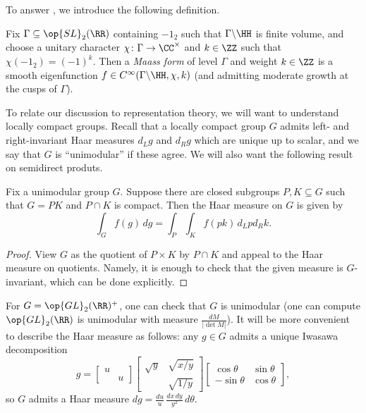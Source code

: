 \documentclass{article}
\begin{document}
To answer , we introduce the following definition.
\begin{definition}
	Fix $\Gamma\subseteq\op{SL}_2(\RR)$ containing $-1_2$ such that $\Gamma\backslash\HH$ is finite volume, and choose a unitary character $\chi\colon\Gamma\to\CC^\times$ and $k\in\ZZ$ such that $\chi(-1_2)=(-1)^k$. Then a \textit{Maass form} of level $\Gamma$ and weight $k\in\ZZ$ is a smooth eigenfunction $f\in C^\infty(\Gamma\backslash\HH,\chi,k)$ (and admitting moderate growth at the cusps of $\Gamma$).
\end{definition}
To relate our discussion to representation theory, we will want to understand locally compact groups. Recall that a locally compact group $G$ admits left- and right-invariant Haar measures $d_Lg$ and $d_Rg$ which are unique up to scalar, and we say that $G$ is ``unimodular'' if these agree. We will also want the following result on semidirect produts.
\begin{proposition}
	Fix a unimodular group $G$. Suppose there are closed subgroups $P,K\subseteq G$ such that $G=PK$ and $P\cap K$ is compact. Then the Haar measure on $G$ is given by
	\[\int_Gf(g)\,dg=\int_P\int_Kf(pk)\,d_Lpd_Rk.\]
\end{proposition}
\begin{proof}
	View $G$ as the quotient of $P\times K$ by $P\cap K$ and appeal to the Haar measure on quotients. Namely, it is enough to check that the given measure is $G$-invariant, which can be done explicitly.
\end{proof}
\begin{example} \label{ex:iwasawa-haar-measure}
	For $G=\op{GL}_2(\RR)^+$, one can check that $G$ is unimodular (one can compute $\op{GL}_2(\RR)$ is unimodular with measure $\frac{dM}{\left|\det M\right|}$). It will be more convenient to describe the Haar measure as follows: any $g\in G$ admits a unique Iwasawa decomposition
	\[g=\begin{bmatrix}
		u \\ & u
	\end{bmatrix}\begin{bmatrix}
		\sqrt y & \sqrt{x/y} \\
		& \sqrt{1/y}
	\end{bmatrix}\begin{bmatrix}
		\cos\theta & \sin\theta \\
		-\sin\theta & \cos\theta
	\end{bmatrix},\]
	so $G$ admits a Haar measure $dg=\frac{du}u\,\frac{dx\,dy}{y^2}\,d\theta$.
\end{example}
\end{document}
